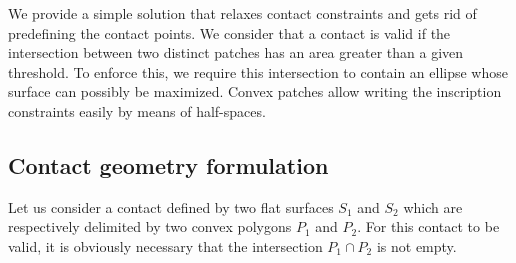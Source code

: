 We provide a simple solution that relaxes contact constraints and gets rid of predefining the contact points.
We consider that a contact is valid if the intersection between two distinct patches has an area greater than a given threshold.
To enforce this, we require this intersection to contain an ellipse whose surface can possibly be maximized.
Convex patches allow writing the inscription constraints easily by means of half-spaces.


\subsection{Contact geometry formulation}
\label{subsec:contact_geometry_formulation}


Let us consider a contact defined by two flat surfaces $S_1$ and $S_2$ which are respectively delimited by two convex polygons $P_1$ and $P_2$.
For this contact to be valid, it is obviously necessary that the intersection $P_1 \cap P_2$ is not empty.

